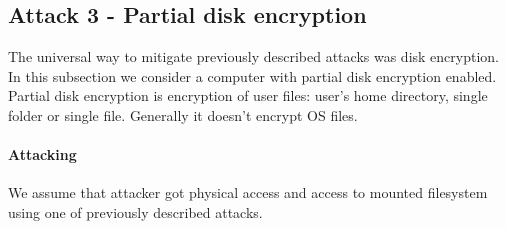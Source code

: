 \subsection{Attack 3 - Partial disk encryption}
The universal way to mitigate previously described attacks was disk encryption. In this subsection we consider a computer with partial disk encryption enabled. Partial disk encryption is encryption of user files: user's home directory, single folder or single file. Generally it doesn't encrypt OS files.

\paragraph*{Attacking}
We assume that attacker got physical access and access to mounted filesystem using one of previously described attacks. 

